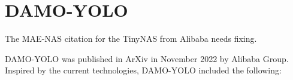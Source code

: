 \documentclass{article}
\begin{document}


\section{DAMO-YOLO}


The MAE-NAS citation for the TinyNAS from Alibaba needs fixing.


DAMO-YOLO \cite{xu2022damo} was published in ArXiv in November 2022 by Alibaba Group. Inspired by the current technologies, DAMO-YOLO included the following:
\end{document}

